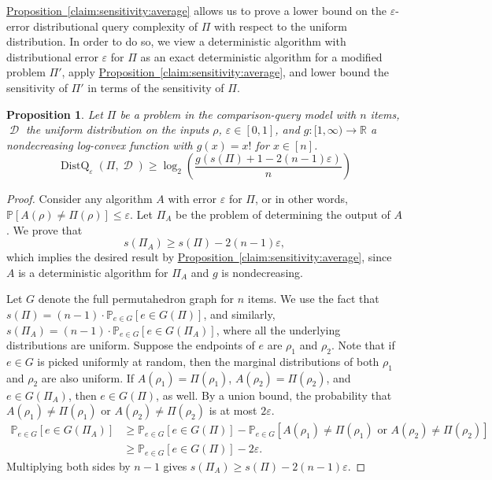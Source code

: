 \documentclass[11pt]{article}
\numberwithin{equation}{section}
\newtheorem{proposition}[theorem]{Proposition}
\theoremstyle{definition}
\theoremstyle{plain}
\newcommand{\expref}[2]{\hyperref[#2]{#1~\ref{#2}}}
\renewcommand{\Pr}{\mathbb{P}}
\newcommand{\ranking}{\rho}
\DeclareMathOperator{\dist}{\mathcal{D}}
\DeclareMathOperator{\DistQ}{DistQ}
\newcommand{\eps}{\varepsilon}
\begin{document}
\expref{Proposition}{claim:sensitivity:average} allows us to prove a lower bound on the $\eps$-error distributional query complexity of $\Pi$ with respect to the uniform distribution. In order to do so, we view a deterministic algorithm with distributional error $\eps$ for $\Pi$ as an exact deterministic algorithm for a modified problem $\Pi'$, apply \expref{Proposition}{claim:sensitivity:average}, and lower bound the sensitivity of $\Pi'$ in terms of the sensitivity of $\Pi$.

\begin{proposition}
	\label{claim:sensitivity:partial}
	Let $\Pi$ be a problem in the comparison-query model with $n$ items, $\dist$ the uniform distribution on the inputs $\ranking$, $\eps\in [0,1]$, and $g: [1,\infty) \to \mathbb{R}$ a nondecreasing log-convex function with $g(x) = x!$ for $x \in [n]$.
	\begin{equation}\label{eq:prop:sensitivity:randomized}
	\DistQ_{\eps}(\Pi,\dist)\ge \log_2 \left(\frac{g(s(\Pi)+1-2(n-1)\eps)}{n}\right)
	\end{equation}
\end{proposition}

\begin{proof}
	Consider any algorithm $A$ with error $\eps$ for $\Pi$, or in other words, $\Pr[A(\ranking)\neq\Pi(\ranking)] \le \eps$. Let $\Pi_A$ be the problem of determining the output of $A$. We prove that 
	\[ s(\Pi_A)\ge s(\Pi)-2(n-1)\eps,\]
	which implies the desired result by \expref{Proposition}{claim:sensitivity:average}, since $A$ is a deterministic algorithm for $\Pi_A$ and $g$ is nondecreasing.
	
	Let $G$ denote the full permutahedron graph for $n$ items. We use the fact that $s(\Pi)=(n-1)\cdot \Pr_{e\in G}[e \in G(\Pi)]$, and similarly, $s(\Pi_A)=(n-1)\cdot \Pr_{e\in G}[e \in G(\Pi_A)]$, where all the underlying distributions are uniform. Suppose the endpoints of $e$ are $\ranking_1$ and $\ranking_2$. Note that if $e \in G$ is picked uniformly at random, then the marginal distributions of both $\ranking_1$ and $\ranking_2$ are also uniform. If $A(\ranking_1)=\Pi(\ranking_1)$, $A(\ranking_2)=\Pi(\ranking_2)$, and $e\in G(\Pi_A)$, then $e\in G(\Pi)$, as well. By a union bound, the probability that $A(\ranking_1) \neq \Pi(\ranking_1)$ or $A(\ranking_2) \neq \Pi(\ranking_2)$ is at most $2\eps$. 
	\begin{align*}
		\Pr_{e\in G}[e\in G(\Pi_A)] &\ge \Pr_{e\in G}[e\in G(\Pi)] - \Pr_{e\in G}[A(\ranking_1)\neq \Pi(\ranking_1)\text{ or }A(\ranking_2)\neq \Pi(\ranking_2)]\\
		&\ge \Pr_{e\in G}[e\in G(\Pi)] - 2\eps.
	\end{align*}
	Multiplying both sides by $n-1$ gives $s(\Pi_A)\ge s(\Pi)-2(n-1)\eps$.
\end{proof}
\end{document}
